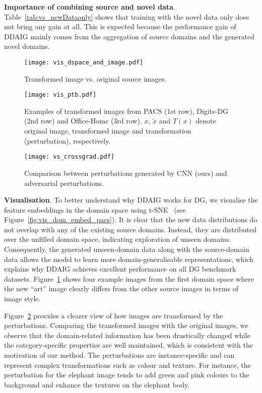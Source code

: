 \documentclass[letterpaper]{article}
\newcommand{\keypoint}[1]{\vspace{0.1cm}\noindent\textbf{#1}}
\begin{document}
\keypoint{Importance of combining source and novel data}.
Table~\ref{tab:vs_newDataonly} shows that training with the novel data only does not bring any gain at all. This is expected because the performance gain of DDAIG mainly comes from the aggregation of source domains and the generated novel domains.


\begin{figure}[t]
\centering
\texttt{[image: vis\_dspace\_and\_image.pdf]}
\caption{\small Transformed image vs. original source images.}
\label{fig:vis_dspace_and_image}
\vspace{-0.2cm}
\end{figure}

\begin{figure}[t]
\centering
\texttt{[image: vis\_ptb.pdf]}
\caption{\small Examples of transformed images from PACS (1st row), Digits-DG (2nd row) and Office-Home (3rd row). $x$, $\tilde{x}$ and $T(x)$ denote original image, transformed image and transformation (perturbation), respectively.}
\label{fig:vis_ptb}
\vspace{-0.3cm}
\end{figure}

\begin{figure}[t]
\centering
\texttt{[image: vs\_crossgrad.pdf]}
\caption{\small Comparison between perturbations generated by CNN (ours) and adversarial perturbations.}
\label{fig:vs_crossgrad}
\vspace{-0.2cm}
\end{figure}


\keypoint{Visualisation}.
To better understand why DDAIG works for DG, we visualise the feature embeddings in the domain space using t-SNE~\cite{tsne} (see Figure~\ref{fig:vis_dom_embed_pacs}). It is clear that the new data distributions do not overlap with any of the existing source domains. Instead, they are distributed over the unfilled domain space, indicating exploration of unseen domains. Consequently, the generated unseen-domain data along with the source-domain data allows the model to learn more domain-generalisable representations, which explains why DDAIG achieves excellent performance on all DG benchmark datasets. Figure~\ref{fig:vis_dspace_and_image} shows four example images from the first domain space where the new ``art'' image clearly differs from the other source images in terms of image style.

Figure~\ref{fig:vis_ptb} provides a clearer view of how images are transformed by the perturbations. Comparing the transformed images with the original images, we observe that the domain-related information has been drastically changed while the category-specific properties are well maintained, which is consistent with the motivation of our method. The perturbations are instance-specific and can represent complex transformations such as colour and texture. For instance, the perturbation for the elephant image tends to add green and pink colours to the background and enhance the textures on the elephant body.
\end{document}

